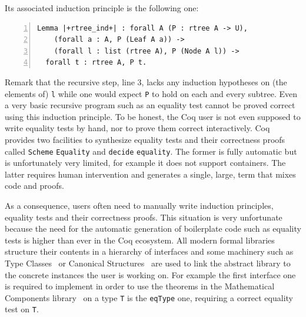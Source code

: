 \documentclass[a4paper,UKenglish,cleveref, autoref]{lipics-v2019}
\begin{document}
\noindent
Its associated induction principle is the following one:
\begin{lstlisting}[numbers=left]
Lemma |+rtree_ind+| : forall A (P : rtree A -> U),
    (forall a : A, P (Leaf A a)) ->
    (forall l : list (rtree A), P (Node A l)) ->
  forall t : rtree A, P t.
\end{lstlisting}

Remark that the recursive step, line 3, lacks any induction hypotheses
on (the elements of) \lstinline+l+ while one would expect
\lstinline+P+ to hold on each and every subtree. Even a very basic
recursive program such as an equality test cannot be proved correct
using this induction principle.
To be honest, the Coq
user is not even supposed to write equality tests by hand, nor to prove
them correct interactively.  Coq provides two facilities to synthesize
equality tests and their correctness proofs called 
\lstinline+Scheme+ \lstinline+Equality+ and
\lstinline+decide+ \lstinline+equality+. 
The former is fully
automatic but is unfortunately very limited, for example it does not support
containers.  The latter requires human intervention 
and generates a single, large, term that mixes code and proofs.

As a consequence, %
users often need to manually write induction principles,
equality tests and their correctness proofs.
This situation is very unfortunate because the need for the automatic
generation of boilerplate code such as equality tests
is higher than ever in the Coq ecosystem.
All modern formal libraries structure their contents in a
hierarchy of interfaces and some machinery such as Type
Classes~\cite{Sozeau:2008:FTC:1459784.1459810} or
Canonical Structures~\cite{10.1007/978-3-642-39634-2_5}
are used to link the abstract library to the
concrete instances the user is working on.
For example the first interface one
is required to implement in order to use the theorems in the Mathematical
Components library~\cite{mcb} on a type \lstinline+T+ is the \lstinline+eqType+
one, requiring a correct equality test on \lstinline+T+.

\end{document}
